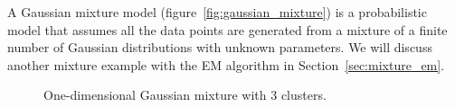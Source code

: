 
A Gaussian mixture model (figure~\ref{fig:gaussian_mixture}) is a probabilistic model that assumes all the data points are generated from a mixture of a finite number of Gaussian distributions with unknown parameters. We will discuss another mixture example with the EM algorithm in Section~\ref{sec:mixture_em}.

\begin{figure}[h!]
  \centering
  \caption{One-dimensional Gaussian mixture with 3 clusters.}
\end{figure}


